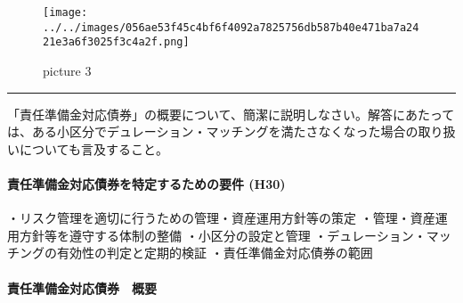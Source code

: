 \documentclass[report,gutter=10mm,fore-edge=10mm,uplatex,dvipdfmx]{jlreq}
\begin{document}

\begin{figure}
\centering
\texttt{[image: ../../images/056ae53f45c4bf6f4092a7825756db587b40e471ba7a2421e3a6f3025f3c4a2f.png]}
\caption{picture 3}
\end{figure}

\begin{center}\rule{0.5\linewidth}{0.5pt}\end{center}


「責任準備金対応債券」の概要について、簡潔に説明しなさい。解答にあたっては、ある小区分でデュレーション・マッチングを満たさなくなった場合の取り扱いについても言及すること。


\paragraph{責任準備金対応債券を特定するための要件
(H30)}

・リスク管理を適切に行うための管理・資産運用方針等の策定
・管理・資産運用方針等を遵守する体制の整備 ・小区分の設定と管理
・デュレーション・マッチングの有効性の判定と定期的検証
・責任準備金対応債券の範囲

\paragraph{責任準備金対応債券　概要}
\end{document}

